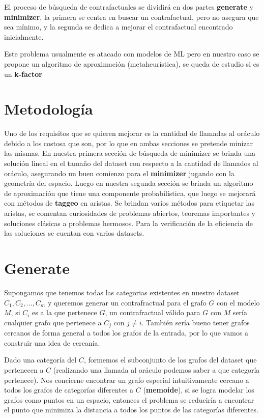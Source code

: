\documentclass[a4paper]{article}
\begin{document}
El proceso de b\'usqueda de contrafactuales se dividir\'a en dos partes \textbf{generate} y \textbf{minimizer}, la primera se centra en buscar un contrafactual, pero no asegura que sea m\'inimo, y la segunda se dedica a mejorar el contrafactual encontrado inicialmente.

Este problema usualmente es atacado con modelos de ML pero en nuestro caso se propone un algoritmo de aproximaci\'on (metaheur\'istica), se queda de estudio si es un \textbf{k-factor} 

\section{Metodolog\'ia}

Uno de los requisitos que se quieren mejorar es la cantidad de llamadas al or\'aculo debido a los costosa que son, por lo que en ambas secciones se pretende minizar las mismas. En nuestra primera secci\'on de b\'usqueda de minimizer se brinda una soluci\'on lineal en el tamaño del dataset con respecto a la cantidad de llamados al or\'aculo, asegurando un buen comienzo para el \textbf{minimizer} jugando con la geometr\'ia del espacio. Luego en nuestra segunda secci\'on se brinda un algoritmo de aproximaci\'on que tiene una componente probabil\'istica, que luego se mejorar\'a con m\'etodos de \textbf{taggeo} en aristas. Se brindan varios m\'etodos para etiquetar las aristas, se comentan curiosidades de problemas abiertos, teoremas importantes y soluciones cl\'asicas a problemas hermosos. Para la verificaci\'on de la eficiencia de las soluciones se cuentan con varios datasets.

\section{Generate}


Supongamos que tenemos todas las categorias existentes en nuestro dataset $C_1, C_2, ..., C_m$ y queremos generar un contrafractual para el grafo $G$ con el modelo $M$, si  $C_i$ es a la que pertenece $G$, un contrafractual v\'alido para $G$ con $M$ ser\'ia cualquier grafo que pertenece a $C_j$ con $j \ne i$. Tambi\'en ser\'ia bueno tener grafos cercanos de forma general a todos los grafos de la entrada, por lo que vamos a construir una idea de cercania.

Dado una categor\'ia del $C$, formemos el subconjunto de los grafos del dataset que pertenecen a $C$ (realizando una llamada al or\'aculo podemos saber a que categor\'ia pertenece). Nos concierne encontrar un grafo especial intuitivamente cercano a todos los grafos de categor\'ias diferentes a $C$ (\textbf{memoide}), si se logra modelar los grafos como puntos en un espacio, entonces el problema se reducir\'ia a encontrar el punto que minimiza la distancia a todos los puntos de las categor\'ias diferentes.
\end{document}
